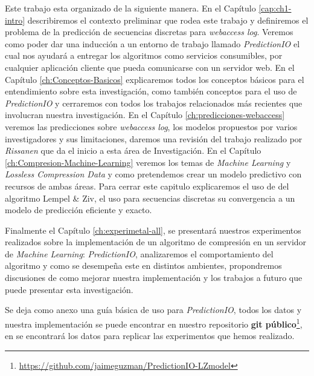 
Este trabajo esta organizado de la siguiente manera. En el Capítulo \ref{cap:ch1-intro} describiremos el contexto preliminar que rodea este trabajo y definiremos el problema de la predicción de secuencias discretas para \emph{webaccess log}. Veremos como poder dar una inducción a un entorno de trabajo llamado \emph{PredictionIO} el cual nos ayudará a entregar los algoritmos como servicios consumibles, por cualquier aplicación cliente que pueda comunicarse con un servidor web.
En el Capítulo \ref{ch:Conceptos-Basicos} explicaremos todos los conceptos básicos para el entendimiento sobre esta investigación, como también conceptos para el uso de \emph{PredictionIO} y cerraremos con todos los trabajos relacionados más recientes que involucran nuestra investigación. En el Capítulo \ref{ch:predicciones-webaccess} veremos las predicciones sobre \emph{webaccess log}, los modelos propuestos por varios investigadores y sus limitaciones, daremos una revisión del trabajo realizado por \emph{Rissanen}\cite{Rissanen1984} que da el inicio a esta área de Investigación.
En el Capítulo \ref{ch:Compresion-Machine-Learning} veremos los temas de \emph{Machine Learning} y \emph{Lossless Compression Data} y como pretendemos crear un modelo predictivo con recursos de ambas áreas. Para cerrar este capitulo explicaremos el uso de del algoritmo Lempel \& Ziv, el uso para secuencias discretas su convergencia a un modelo de predicción eficiente y exacto. 

Finalmente el Capítulo \ref{ch:experimetal-all}, se presentará nuestros experimentos realizados sobre la implementación de un algoritmo de compresión en un servidor de \emph{Machine Learning}: \emph{PredictionIO}, analizaremos el comportamiento del algoritmo y como se desempeña este en distintos ambientes, propondremos discusiones de como mejorar nuestra implementación y los trabajos a futuro que puede presentar esta investigación.

Se deja como anexo una guía básica de uso para \emph{PredictionIO}, todos los datos y nuestra implementación se puede encontrar en nuestro repositorio \textbf{git público}\footnote{\url{https://github.com/jaimeguzman/PredictionIO-LZmodel}}, en se encontrará  los datos para replicar las experimentos que hemos realizado. 
